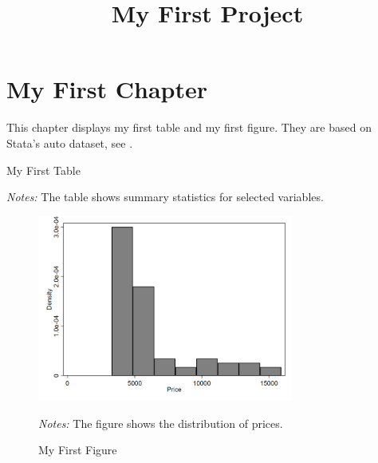 \documentclass{article}
\title{My First Project}
\author{}
\date{}
\begin{document}
\maketitle

\section{My First Chapter}
This chapter displays my first table and my first figure. They are based on Stata's auto dataset, see \citet{stata_press_datasets_2021}.

\begin{table}[!ht]
\label{myfirsttable}
\caption{My First Table}
\centering
	
\begin{tablenotes}
	\item \emph{Notes:} The table shows summary statistics for selected variables.
\end{tablenotes}
\end{table}

\begin{figure}[!ht]
\label{myfirstfigure}
\caption{My First Figure}
\centering
	\includegraphics[width=0.75\textwidth]{../output/figures/myfirstfigure.png}
\begin{tablenotes}
	\item \emph{Notes:} The figure shows the distribution of prices.
\end{tablenotes}
\end{figure}




\end{document}
